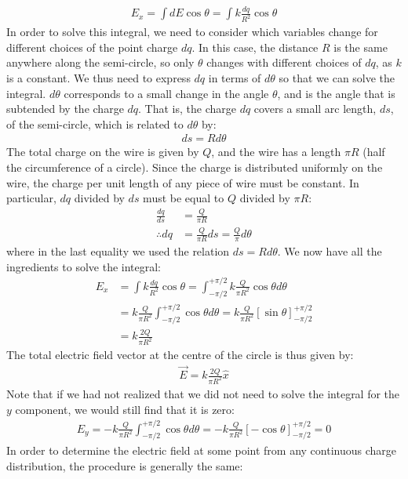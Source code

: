 \begin{align*}
E_x = \int dE\cos\theta = \int k\frac{dq}{R^2} \cos\theta
\end{align*}
In order to solve this integral, we need to consider which variables change for different choices of the point charge $dq$. In this case, the distance $R$ is the same anywhere along the semi-circle, so only $\theta$ changes with different choices of $dq$, as $k$ is a constant. We thus need to express $dq$ in terms of $d\theta$ so that we can solve the integral. $d\theta$ corresponds to a small change in the angle $\theta$, and is the angle that is subtended by the charge $dq$. That is, the charge $dq$ covers a small arc length, $ds$, of the semi-circle, which is related to $d\theta$ by:
\begin{align*}
ds = Rd\theta
\end{align*}
The total charge on the wire is given by $Q$, and the wire has a length $\pi R$ (half the circumference of a circle). Since the charge is distributed uniformly on the wire, the charge per unit length of any piece of wire must be constant. In particular, $dq$ divided by $ds$ must be equal to $Q$ divided by $\pi R$:
\begin{align*}
\frac{dq}{ds}&=\frac{Q}{\pi R}\\
\therefore dq &=\frac{Q}{\pi R}ds=\frac{Q}{\pi}d\theta
\end{align*}
where in the last equality we used the relation $ds=Rd\theta$. We now have all the ingredients to solve the integral:
\begin{align*}
E_x &= \int k\frac{dq}{R^2} \cos\theta = \int_{-\pi/2}^{+\pi/2} k\frac{Q}{\pi R^2}\cos\theta d\theta\\
&= k\frac{Q}{\pi R^2}\int_{-\pi/2}^{+\pi/2}\cos\theta d\theta=k\frac{Q}{\pi R^2}\left[ \sin\theta \right]_{-\pi/2}^{+\pi/2}\\
&= k\frac{2Q}{\pi R^2}
\end{align*}
The total electric field vector at the centre of the circle is thus given by:
\begin{align*}
\vec E = k\frac{2Q}{\pi R^2} \hat x
\end{align*}
Note that if we had not realized that we did not need to solve the integral for the $y$ component, we would still find that it is zero:
\begin{align*}
E_y= -k\frac{Q}{\pi R^2}\int_{-\pi/2}^{+\pi/2}\cos\theta d\theta=-k\frac{Q}{\pi R^2}\left[ -\cos\theta \right]_{-\pi/2}^{+\pi/2}=0
\end{align*}
In order to determine the electric field at some point from any continuous charge distribution, the procedure is generally the same:
